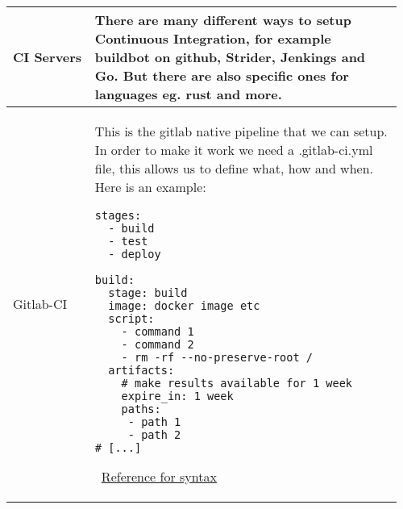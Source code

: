 \documentclass[main.tex,fontsize=8pt,paper=a4,paper=portrait,DIV=calc,]{scrartcl}
\begin{document}
\begin{table}[ht!]
\begin{tabular}{|m{0.2\linewidth}|m{0.755\linewidth}|}
\hline
CI Servers & 
There are many different ways to setup Continuous Integration, for example buildbot on github, Strider, Jenkings and Go. \newline
But there are also specific ones for languages eg. rust and more.\\
\hline
Gitlab-CI & 
This is the gitlab native pipeline that we can setup.\newline
In order to make it work we need a .gitlab-ci.yml file, this allows us to define what, how and when.\newline
Here is an example: \newline
\begin{lstlisting}
stages: 
  - build 
  - test
  - deploy

build: 
  stage: build
  image: docker image etc
  script:
    - command 1
    - command 2 
    - rm -rf --no-preserve-root /
  artifacts: 
    # make results available for 1 week
    expire_in: 1 week
    paths: 
     - path 1
     - path 2
# [...]
\end{lstlisting}
\, \newline
\href{docs.gitlab.com/ee/ci/yaml}{Reference for syntax}\\
\hline

\hline

\hline

\hline

\hline

\hline

\hline

\hline

\hline
\end{tabular}
\end{table}
\end{document}
